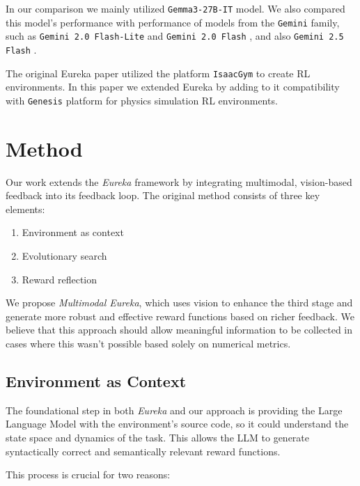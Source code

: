 \documentclass[10pt,twocolumn]{article}
\begin{document}
In our comparison we mainly utilized \verb|Gemma3-27B-IT| \cite{Gemma3-27B-IT} model. We also compared this model's performance with performance of models from the \verb|Gemini| family, such as \verb|Gemini 2.0 Flash-Lite| \cite{Gemini_2.0_Flash_Lite} and \verb|Gemini 2.0 Flash| \cite{Gemini_2.0_Flash}, and also \verb|Gemini 2.5 Flash| \cite{Gemini_2.5}.

The original Eureka paper utilized the platform \verb|IsaacGym| \cite{isaac_gym} to create RL environments. In this paper we extended Eureka by adding to it compatibility with \verb|Genesis| \cite{Genesis} platform for physics simulation RL environments.

\section{Method}

Our work extends the \textit{Eureka} framework by integrating multimodal, vision-based feedback into its feedback loop. The original method consists of three key elements:
\begin{enumerate}
    \item Environment as context
    \item Evolutionary search
    \item Reward reflection
\end{enumerate}

We propose \textit{Multimodal Eureka}, which uses vision to enhance the third stage and generate more robust and effective reward functions based on richer feedback. We believe that this approach should allow meaningful information to be collected in cases where this wasn't possible based solely on numerical metrics.


\subsection{Environment as Context}

The foundational step in both \textit{Eureka} and our approach is providing the Large Language Model with the environment's source code, so it could understand the state space and dynamics of the task. This allows the LLM to generate syntactically correct and semantically relevant reward functions.

This process is crucial for two reasons:
\end{document}
